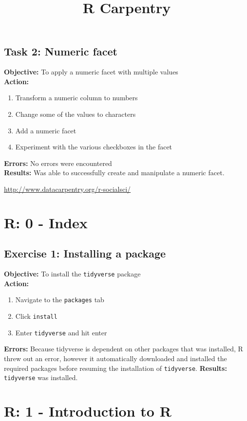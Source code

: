 \documentclass{article}
\begin{document}
\subsection{Task 2: Numeric facet}
\textbf{Objective:} To apply a numeric facet with multiple values\\
\textbf{Action:}
\begin{enumerate}
    \item Transform a numeric column to numbers
    \item Change some of the values to characters
    \item Add a numeric facet
    \item Experiment with the various checkboxes in the facet
\end{enumerate}
\textbf{Errors: }No errors were encountered\\
\textbf{Results:} Was able to successfully create and manipulate a numeric facet.
\newpage
\title{R Carpentry}
\maketitle
\begin{center}
    \url{http://www.datacarpentry.org/r-socialsci/}
\end{center}
\newpage
\section{R: 0 - Index}
\subsection{Exercise 1: Installing a package}
\textbf{Objective:} To install the \texttt{tidyverse} package\\
\textbf{Action:}
\begin{enumerate}
    \item Navigate to the \texttt{packages} tab
    \item Click \texttt{install}
    \item Enter \texttt{tidyverse} and hit enter
\end{enumerate}
\textbf{Errors:} Because tidyverse is dependent on other packages that was installed, R threw out an error, however it automatically downloaded and installed the required packages before resuming the installation of \texttt{tidyverse}.
\textbf{Results:} \texttt{tidyverse} was installed.
\section{R: 1 - Introduction to R}
\end{document}
